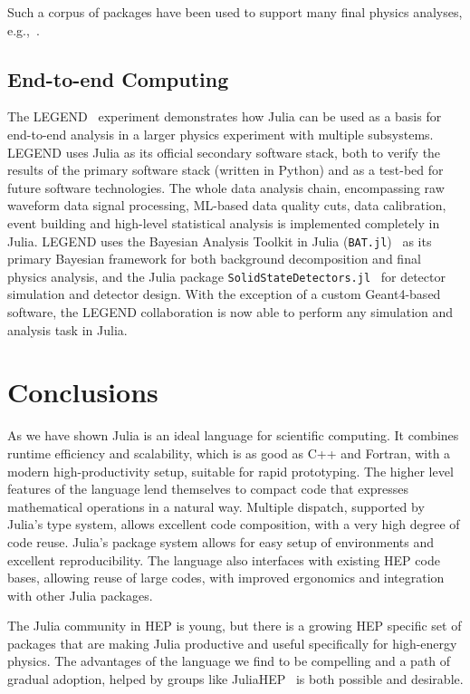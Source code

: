 \documentclass{webofc}
\begin{document}
Such a corpus of packages have been used to support many final physics
analyses, e.g.,~\cite{Aaij2022,PhysRevD.104.L091102,Bibrzycki2021}.

\subsection{End-to-end Computing}
\label{sec:e2dlegend}

The LEGEND~\cite{LEGEND:2017AIPC} experiment demonstrates how Julia can be used
as a basis for end-to-end analysis in a larger physics experiment with multiple
subsystems. LEGEND uses Julia as its official secondary software stack, both to
verify the results of the primary software stack (written in Python) and as a
test-bed for future software technologies. The whole data analysis chain,
encompassing raw waveform data signal processing, ML-based data quality cuts,
data calibration, event building and high-level statistical analysis is
implemented completely in Julia. LEGEND uses the Bayesian Analysis
Toolkit in Julia (\texttt{BAT.jl})~\cite{Schulz:2021BAT} as its primary Bayesian
framework for both background decomposition and final physics analysis, and the
Julia package \texttt{SolidStateDetectors.jl}~\cite{Abt:2021SSD} for detector simulation
and detector design. With the exception of a custom Geant4-based software, the
LEGEND collaboration is now able to perform any simulation and analysis task in
Julia.


\section{Conclusions}

As we have shown Julia is an ideal language for scientific computing. It
combines runtime efficiency and scalability, which is as good as C++ and
Fortran, with a modern high-productivity setup, suitable for rapid prototyping.
The higher level features of the language lend themselves to compact code that
expresses mathematical operations in a natural way. Multiple dispatch, supported
by Julia's type system, allows excellent code composition, with a very high
degree of code reuse. Julia's package system allows for easy setup of
environments and excellent reproducibility. The language also interfaces with
existing HEP code bases, allowing reuse of large codes, with improved ergonomics
and integration with other Julia packages.

The Julia community in HEP is young, but there is a growing HEP specific set of
packages that are making Julia productive and useful specifically for high-energy
physics. The advantages of the language we find to be compelling and a path of
gradual adoption, helped by groups like JuliaHEP~\cite{juliahep} is both
possible and desirable.

\sloppy
\raggedright

\end{document}
